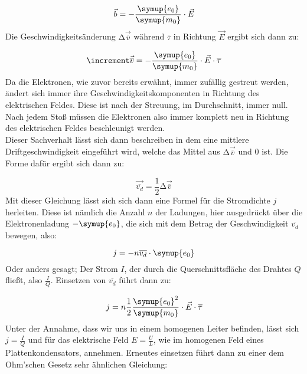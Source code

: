\begin{equation}
  \vec{b} = -\frac{\symup{e_0}}{\symup{m_0}} \cdot \vec{E} \nonumber
\end{equation}
\noindent
Die Geschwindigkeitsänderung $\increment\vec{\overline{v}}$ während $\overline{\tau}$ in Richtung $\vec{E}$ ergibt sich dann zu:

\begin{equation}
  \increment\vec{\overline{v}}= -\frac{\symup{e_0}}{\symup{m_0}}\cdot \vec{E} \cdot \overline{\tau} \nonumber
\end{equation}
\noindent
Da die Elektronen, wie zuvor bereits erwähnt, immer zufällig gestreut werden, ändert sich immer ihre Geschwindigkeitskomponenten in Richtung
des elektrischen Feldes. Diese ist nach der Streuung, im Durchschnitt, immer null.
Nach jedem Stoß müssen die Elektronen also immer komplett neu in Richtung des elektrischen Feldes beschleunigt werden.\\
Dieser Sachverhalt lässt sich dann beschreiben in dem eine mittlere Driftgeschwindigkeit eingeführt wird, welche das Mittel aus $\increment\vec{\overline{v}}$ 
und 0 ist. Die Forme dafür ergibt sich dann zu:

\begin{equation}
  \vec{\overline{v_d}}=\frac{1}{2}\increment\vec{\overline{v}} \nonumber
\end{equation}
\noindent
Mit dieser Gleichung lässt sich sich dann eine Formel für die Stromdichte $j$ herleiten. Diese ist nämlich die Anzahl $n$ der Ladungen, hier ausgedrückt
über die Elektronenladung $-\symup{e_0}$, die sich mit dem Betrag der Geschwindigkeit $\overline{v_d}$ bewegen, also:

\begin{equation}
  j=-n\overline{v_d}\cdot \symup{e_0} 
  \label{eqn:j1}
\end{equation}
\noindent
Oder anders gesagt; Der Strom $I$, der durch die Querschnittsfläche des Drahtes $Q$ fließt, also $\frac{I}{Q}$.
Einsetzen von $\overline{v_d}$  führt dann zu:

\begin{equation}
  j=n\frac{1}{2}\frac{\symup{e_0}^2}{\symup{m_0}}\cdot \vec{E} \cdot \overline{\tau} \nonumber
\end{equation}
\noindent
Unter der Annahme, dass wir uns in einem homogenen Leiter befinden, lässt sich $j=\frac{I}{Q}$ und für das elektrische Feld $E=\frac{U}{L}$, wie im homogenen Feld eines Plattenkondensators, annehmen.
Erneutes einsetzen führt dann zu einer dem Ohm'schen Gesetz sehr ähnlichen Gleichung:

